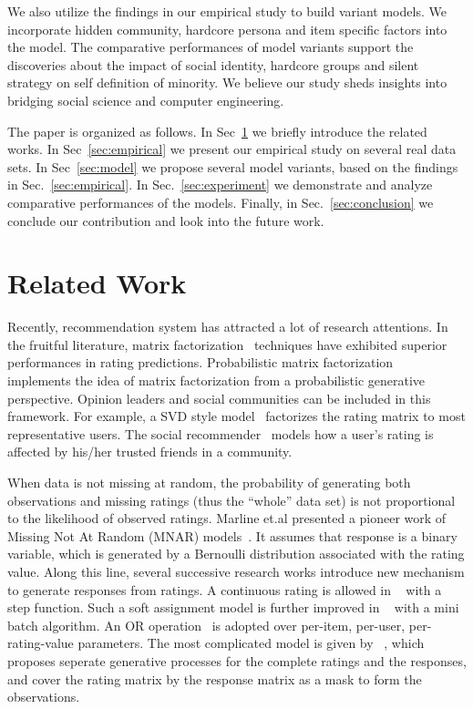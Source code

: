 \documentclass[sigconf]{acmart}
\begin{document}
We also utilize the findings in our empirical study to build variant models. We incorporate hidden community, hardcore persona and item specific factors into the model. The comparative performances of model variants support the discoveries about the impact of social identity, hardcore groups and silent strategy on self definition of minority. We believe our study sheds insights into bridging social science and computer engineering.

The paper is organized as follows. In Sec~\ref{sec:related} we briefly introduce the related works. In Sec~\ref{sec:empirical} we present our empirical study on several real data sets. In Sec~\ref{sec:model} we propose several model variants, based on the findings in Sec.~\ref{sec:empirical}. In Sec.~\ref{sec:experiment} we demonstrate and analyze comparative performances of the models. Finally, in Sec.~\ref{sec:conclusion} we conclude our contribution and look into the future work.


\section{Related Work}\label{sec:related}
Recently, recommendation system has attracted a lot of research attentions. In the fruitful literature, matrix factorization~\cite{Koren2009Matrix} techniques have exhibited superior performances in rating predictions. Probabilistic matrix factorization~\cite{salakhutdinov2008probabilistic} implements the idea of matrix factorization from a probabilistic generative perspective. Opinion leaders and social communities can be included in this framework. For example, a SVD style model~\cite{Liu2011Wisdom} factorizes the rating matrix to most representative users. The social recommender~\cite{Jamali2011Generalized} models how a user's rating is affected by his/her trusted friends in a community.


When data is not missing at random, the probability of generating both observations and missing ratings (thus the ``whole'' data set) is not proportional to the likelihood of observed ratings. Marline et.al presented a pioneer work of Missing Not At Random (MNAR) models~\cite{Marlin2009Collaborative}. It assumes that response is a binary variable, which is generated by a Bernoulli distribution associated with the rating value. Along this line, several successive research works introduce new mechanism to generate responses from ratings. A continuous rating is allowed in ~\cite{Ling2012Response} with a step function. Such a soft assignment model is further improved in ~\cite{Yang2015Boosting} with a mini batch algorithm. An OR operation~\cite{Kim2014Bayesian} is adopted over per-item, per-user, per-rating-value parameters. The most complicated model is given by ~\cite{Hernandez-Lobato2014Probabilistic}, which proposes seperate generative processes for the complete ratings and the responses, and cover the rating matrix by the response matrix as a mask to form the observations.
\end{document}
